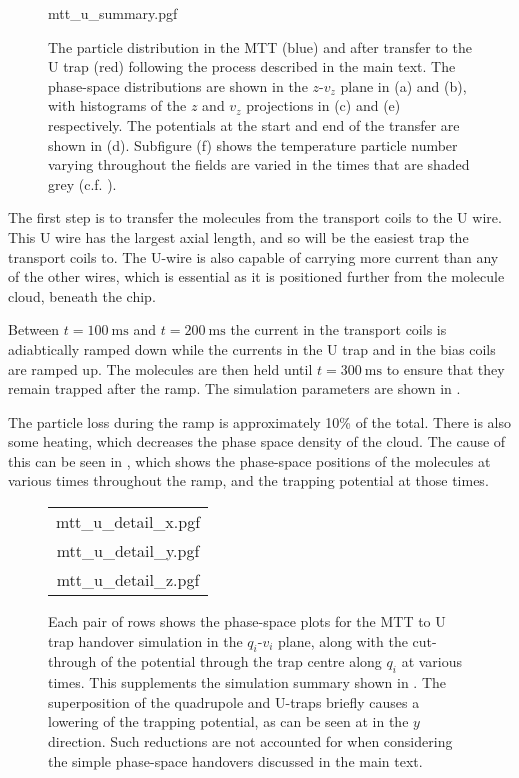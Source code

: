 \begin{figure}[p]
\centering
  {mtt_u_summary.pgf}
  \caption{
    The particle distribution in the MTT (blue) and after transfer to the U
    trap (red) following the process described in the main text. The
    phase-space distributions are shown in the $z$-$v_z$ plane in (a) and (b),
    with histograms of the $z$ and $v_z$ projections in (c) and (e)
    respectively. The potentials at the start and end of the transfer are shown
    in (d). Subfigure (f) shows the temperature particle number varying
    throughout the fields are varied in the times that are shaded grey (c.f.
    ). 
  }
  \label{design:fig:mttusum}
\end{figure}




%
The first step is to transfer the molecules from the transport coils to the U
wire. This U wire has the largest axial length, and so will be the easiest trap
the transport coils to. The U-wire is also capable of carrying more current
than any of the other wires, which is essential as it is positioned further
from the molecule cloud, beneath the chip.

Between $t=\SI{100}{\milli\second}$ and $t=\SI{200}{\milli\second}$ the current
in the transport coils is adiabtically ramped down while the currents in
the U trap and in the bias coils are ramped up. The molecules are then held
until $t=\SI{300}{\milli\second}$ to ensure that they remain trapped after the
ramp. The simulation parameters are shown in
.

The particle loss during the ramp is approximately 10\% of the total. There is
also some heating, which decreases the phase space density of the cloud. The
cause of this can be seen in , which shows the
phase-space positions of the molecules at various times throughout the ramp,
and the trapping potential at those times.

\begin{figure}[p]
\centering
  \begin{tabular}{c}
  {mtt_u_detail_x.pgf} \\
  {mtt_u_detail_y.pgf} \\
  {mtt_u_detail_z.pgf}
  \end{tabular}
  \caption{
    Each pair of rows shows the phase-space plots for the MTT to U trap
    handover simulation in the $q_i$-$v_i$ plane, along with the cut-through of
    the potential through the trap centre along $q_i$ at various times. This
    supplements the simulation summary shown in .
    The superposition of the quadrupole and U-traps briefly causes a lowering
    of the trapping potential, as can be seen at  in the $y$
    direction. Such reductions are not accounted for when considering the
    simple phase-space handovers discussed in the main text.
  }
  \label{design:fig:mttudetail}
\end{figure}

